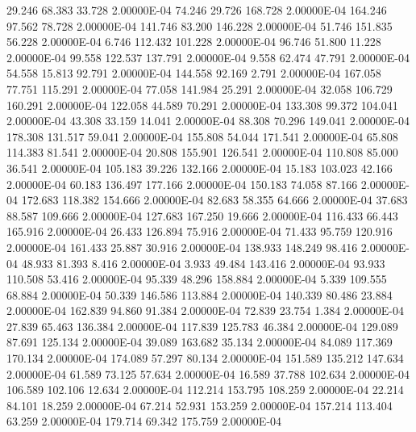     29.246    68.383    33.728  2.00000E-04
    74.246    29.726   168.728  2.00000E-04
   164.246    97.562    78.728  2.00000E-04
   141.746    83.200   146.228  2.00000E-04
    51.746   151.835    56.228  2.00000E-04
     6.746   112.432   101.228  2.00000E-04
    96.746    51.800    11.228  2.00000E-04
    99.558   122.537   137.791  2.00000E-04
     9.558    62.474    47.791  2.00000E-04
    54.558    15.813    92.791  2.00000E-04
   144.558    92.169     2.791  2.00000E-04
   167.058    77.751   115.291  2.00000E-04
    77.058   141.984    25.291  2.00000E-04
    32.058   106.729   160.291  2.00000E-04
   122.058    44.589    70.291  2.00000E-04
   133.308    99.372   104.041  2.00000E-04
    43.308    33.159    14.041  2.00000E-04
    88.308    70.296   149.041  2.00000E-04
   178.308   131.517    59.041  2.00000E-04
   155.808    54.044   171.541  2.00000E-04
    65.808   114.383    81.541  2.00000E-04
    20.808   155.901   126.541  2.00000E-04
   110.808    85.000    36.541  2.00000E-04
   105.183    39.226   132.166  2.00000E-04
    15.183   103.023    42.166  2.00000E-04
    60.183   136.497   177.166  2.00000E-04
   150.183    74.058    87.166  2.00000E-04
   172.683   118.382   154.666  2.00000E-04
    82.683    58.355    64.666  2.00000E-04
    37.683    88.587   109.666  2.00000E-04
   127.683   167.250    19.666  2.00000E-04
   116.433    66.443   165.916  2.00000E-04
    26.433   126.894    75.916  2.00000E-04
    71.433    95.759   120.916  2.00000E-04
   161.433    25.887    30.916  2.00000E-04
   138.933   148.249    98.416  2.00000E-04
    48.933    81.393     8.416  2.00000E-04
     3.933    49.484   143.416  2.00000E-04
    93.933   110.508    53.416  2.00000E-04
    95.339    48.296   158.884  2.00000E-04
     5.339   109.555    68.884  2.00000E-04
    50.339   146.586   113.884  2.00000E-04
   140.339    80.486    23.884  2.00000E-04
   162.839    94.860    91.384  2.00000E-04
    72.839    23.754     1.384  2.00000E-04
    27.839    65.463   136.384  2.00000E-04
   117.839   125.783    46.384  2.00000E-04
   129.089    87.691   125.134  2.00000E-04
    39.089   163.682    35.134  2.00000E-04
    84.089   117.369   170.134  2.00000E-04
   174.089    57.297    80.134  2.00000E-04
   151.589   135.212   147.634  2.00000E-04
    61.589    73.125    57.634  2.00000E-04
    16.589    37.788   102.634  2.00000E-04
   106.589   102.106    12.634  2.00000E-04
   112.214   153.795   108.259  2.00000E-04
    22.214    84.101    18.259  2.00000E-04
    67.214    52.931   153.259  2.00000E-04
   157.214   113.404    63.259  2.00000E-04
   179.714    69.342   175.759  2.00000E-04
